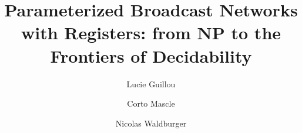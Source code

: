 \documentclass[runningheads]{llncs}
\begin{document}
\title{Parameterized Broadcast Networks with Registers: from NP to the Frontiers of Decidability}




\author{Lucie Guillou \and Corto Mascle \and Nicolas Waldburger}




	\maketitle 
	


\newcommand{\cortoin}[1]{\todo[color=blue!20,inline]{\small #1}}
\newcommand{\corto}[1]{\todo[color=blue!20]{\small #1}}

\newcommand{\nicoin}[1]{\todo[color=red!20,inline]{\small #1}}
\newcommand{\nico}[1]{\todo[color=red!20]{\small #1}}

\newcommand{\luin}[1]{\todo[color=teal!20,inline]{\small #1}}
\newcommand{\lu}[1]{\todo[color=teal!20]{\small #1}}
\end{document}
